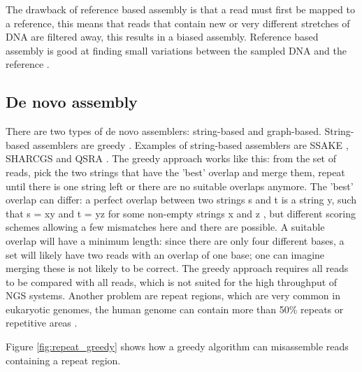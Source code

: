 \documentclass[../main/thesis.tex]{subfiles}
\begin{document}
The drawback of reference based assembly is that a read must first be mapped to a reference, this means that reads that contain new or very different stretches of DNA are filtered away, this results in a biased assembly.
Reference based assembly is good at finding small variations between the sampled DNA and the reference \cite{denovo_vs_reference}.

\subsection{De novo assembly}


There are two types of de novo assemblers: string-based and graph-based.
String-based assemblers are greedy \cite{denovo1}.
Examples of string-based assemblers are SSAKE \cite{ssake}, SHARCGS \cite{sharcgs} and QSRA \cite{qsra}.
The greedy approach works like this: from the set of reads, pick the two strings that have the 'best' overlap and merge them, repeat until there is one string left or there are no suitable overlaps anymore.
The 'best' overlap can differ: a perfect overlap between two strings s and t is a string y, such that s = xy and t = yz for some non-empty strings x and z \cite{denovo2}, but different scoring schemes allowing a few mismatches here and there are possible.
A suitable overlap will have a minimum length: since there are only four different bases, a set will likely have two reads with an overlap of one base; one can imagine merging these is not likely to be correct.
The greedy approach requires all reads to be compared with all reads, which is not suited for the high throughput of NGS systems.
Another problem are repeat regions, which are very common in eukaryotic genomes, the human genome can contain more than 50\% repeats or repetitive areas \cite{repeats1}\cite{repeats2}.

Figure \ref{fig:repeat_greedy} shows how a greedy algorithm can misassemble reads containing a repeat region.

\end{document}
